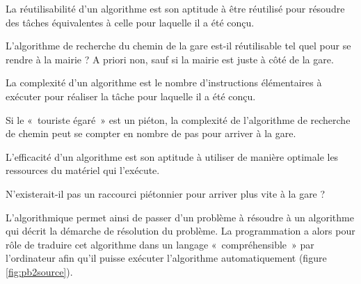 
\begin{defin}
\label{definition:réutilisabilité}
La réutilisabilité d'un algorithme est son aptitude à être réutilisé pour résoudre
des tâches équivalentes à celle pour laquelle il a été conçu.
\end{defin}
\noindent L'algorithme de recherche du chemin de la gare est-il réutilisable tel quel pour se rendre
à la mairie ? A priori non, sauf si la mairie est juste à côté de la gare.

\begin{defin}
La complexité d'un algorithme est le nombre d'instructions élémentaires à exécuter pour
réaliser la tâche pour laquelle il a été conçu.
\end{defin}
\noindent Si le «~touriste égaré~» est un piéton, la complexité de l'algorithme de recherche de chemin
peut se compter en nombre de pas pour arriver à la gare.

\begin{defin}
L'efficacité d'un algorithme est son aptitude à utiliser de manière optimale
les ressources du matériel qui l'exécute.
\end{defin}
\noindent N'existerait-il pas un raccourci piétonnier pour arriver plus vite à la gare ?

L'algorithmique permet ainsi de passer d'un problème à résoudre à un algorithme
qui décrit la démarche de résolution du problème. La programmation a alors pour rôle de traduire cet
algorithme dans un langage «~compréhensible~» par l'ordinateur afin qu'il
puisse exécuter l'algorithme automatiquement (figure \ref{fig:pb2source}).


